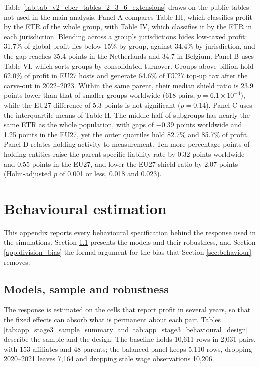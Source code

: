 \documentclass[11pt,a4paper]{article}
\newcommand{\EUR}{\texteuro}
\begin{document}
Table \ref{tab:tab_v2_cbcr_tables_2_3_6_extensions} draws on the public tables not used in the main analysis. Panel A compares Table III, which classifies profit by the ETR of the whole group, with Table IV, which classifies it by the ETR in each jurisdiction. Blending across a group's jurisdictions hides low-taxed profit: 31.7\% of global profit lies below 15\% by group, against 34.4\% by jurisdiction, and the gap reaches 35.4 points in the Netherlands and 34.7 in Belgium. Panel B uses Table VI, which sorts groups by consolidated turnover. Groups above \EUR10 billion hold 62.0\% of profit in EU27 hosts and generate 64.6\% of EU27 top-up tax after the carve-out in 2022–2023. Within the same parent, their median shield ratio is 23.9 points lower than that of smaller groups worldwide (618 pairs, $p=6.1\times10^{-4}$), while the EU27 difference of 5.3 points is not significant ($p=0.14$). Panel C uses the interquartile means of Table II. The middle half of subgroups has nearly the same ETR as the whole population, with gaps of $-0.39$ points worldwide and 1.25 points in the EU27, yet the outer quartiles hold 82.7\% and 85.7\% of profit. Panel D relates holding activity to measurement. Ten more percentage points of holding entities raise the parent-specific liability rate by 0.32 points worldwide and 0.55 points in the EU27, and lower the EU27 shield ratio by 2.07 points (Holm-adjusted $p$ of 0.001 or less, 0.018 and 0.023).

\clearpage
\section{Behavioural estimation}\label{app:behaviour}

This appendix reports every behavioural specification behind the response used in the simulations. Section \ref{app:beh_models} presents the models and their robustness, and Section \ref{app:division_bias} the formal argument for the bias that Section \ref{sec:behaviour} removes.

\subsection{Models, sample and robustness}\label{app:beh_models}

The response is estimated on the cells that report profit in several years, so that the fixed effects can absorb what is permanent about each pair. Tables \ref{tab:app_stage3_sample_summary} and \ref{tab:app_stage3_behavioural_design} describe the sample and the design. The baseline holds 10,611 rows in 2,031 pairs, with 153 affiliates and 48 parents; the balanced panel keeps 5,110 rows, dropping 2020–2021 leaves 7,164 and dropping stale wage observations 10,206.
\end{document}
